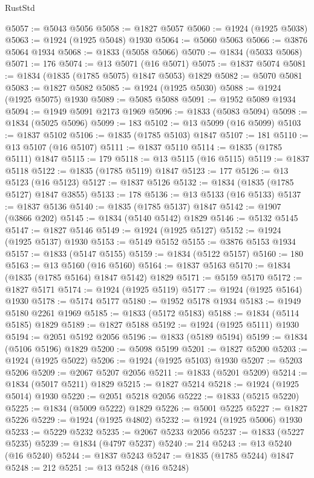 \begin{lexlean}{RustStd}
\begin{coremodule}
{\begin{coremodule}
{{{{{@5057 := @5043 @5056
@5058 := @1827 @5057
@5060 := @1924 (@1925 @5038)
@5063 := @1924 (@1925 @5048) @1930
@5064 := @5060 @5063
@5066 := @3876 @5064 @1934
@5068 := @1833 (@5058 @5066)
@5070 := @1834 (@5033 @5068)
@5071 := 176
@5074 := @13 @5071 (@16 @5071)
@5075 := @1837 @5074
@5081 := @1834 (@1835 (@1785 @5075) @1847 @5053) @1829
@5082 := @5070 @5081
@5083 := @1827 @5082
@5085 := @1924 (@1925 @5030)
@5088 := @1924 (@1925 @5075) @1930
@5089 := @5085 @5088
@5091 := @1952 @5089 @1934
@5094 := @1949 @5091 @2173 @1969
@5096 := @1833 (@5083 @5094)
@5098 := @1834 (@5025 @5096)
@5099 := 183
@5102 := @13 @5099 (@16 @5099)
@5103 := @1837 @5102
@5106 := @1835 (@1785 @5103) @1847
@5107 := 181
@5110 := @13 @5107 (@16 @5107)
@5111 := @1837 @5110
@5114 := @1835 (@1785 @5111) @1847
@5115 := 179
@5118 := @13 @5115 (@16 @5115)
@5119 := @1837 @5118
@5122 := @1835 (@1785 @5119) @1847
@5123 := 177
@5126 := @13 @5123 (@16 @5123)
@5127 := @1837 @5126
@5132 := @1834 (@1835 (@1785 @5127) @1847 @3855)
@5133 := 178
@5136 := @13 @5133 (@16 @5133)
@5137 := @1837 @5136
@5140 := @1835 (@1785 @5137) @1847
@5142 := @1907 (@3866 @202)
@5145 := @1834 (@5140 @5142) @1829
@5146 := @5132 @5145
@5147 := @1827 @5146
@5149 := @1924 (@1925 @5127)
@5152 := @1924 (@1925 @5137) @1930
@5153 := @5149 @5152
@5155 := @3876 @5153 @1934
@5157 := @1833 (@5147 @5155)
@5159 := @1834 (@5122 @5157)
@5160 := 180
@5163 := @13 @5160 (@16 @5160)
@5164 := @1837 @5163
@5170 := @1834 (@1835 (@1785 @5164) @1847 @5142) @1829
@5171 := @5159 @5170
@5172 := @1827 @5171
@5174 := @1924 (@1925 @5119)
@5177 := @1924 (@1925 @5164) @1930
@5178 := @5174 @5177
@5180 := @1952 @5178 @1934
@5183 := @1949 @5180 @2261 @1969
@5185 := @1833 (@5172 @5183)
@5188 := @1834 (@5114 @5185) @1829
@5189 := @1827 @5188
@5192 := @1924 (@1925 @5111) @1930
@5194 := @2051 @5192 @2056
@5196 := @1833 (@5189 @5194)
@5199 := @1834 (@5106 @5196) @1829
@5200 := @5098 @5199
@5201 := @1827 @5200
@5203 := @1924 (@1925 @5022)
@5206 := @1924 (@1925 @5103) @1930
@5207 := @5203 @5206
@5209 := @2067 @5207 @2056
@5211 := @1833 (@5201 @5209)
@5214 := @1834 (@5017 @5211) @1829
@5215 := @1827 @5214
@5218 := @1924 (@1925 @5014) @1930
@5220 := @2051 @5218 @2056
@5222 := @1833 (@5215 @5220)
@5225 := @1834 (@5009 @5222) @1829
@5226 := @5001 @5225
@5227 := @1827 @5226
@5229 := @1924 (@1925 @4802)
@5232 := @1924 (@1925 @5006) @1930
@5233 := @5229 @5232
@5235 := @2067 @5233 @2056
@5237 := @1833 (@5227 @5235)
@5239 := @1834 (@4797 @5237)
@5240 := 214
@5243 := @13 @5240 (@16 @5240)
@5244 := @1837 @5243
@5247 := @1835 (@1785 @5244) @1847
@5248 := 212
@5251 := @13 @5248 (@16 @5248)
}}}}}
\end{coremodule}}
\end{coremodule}
\end{lexlean}
